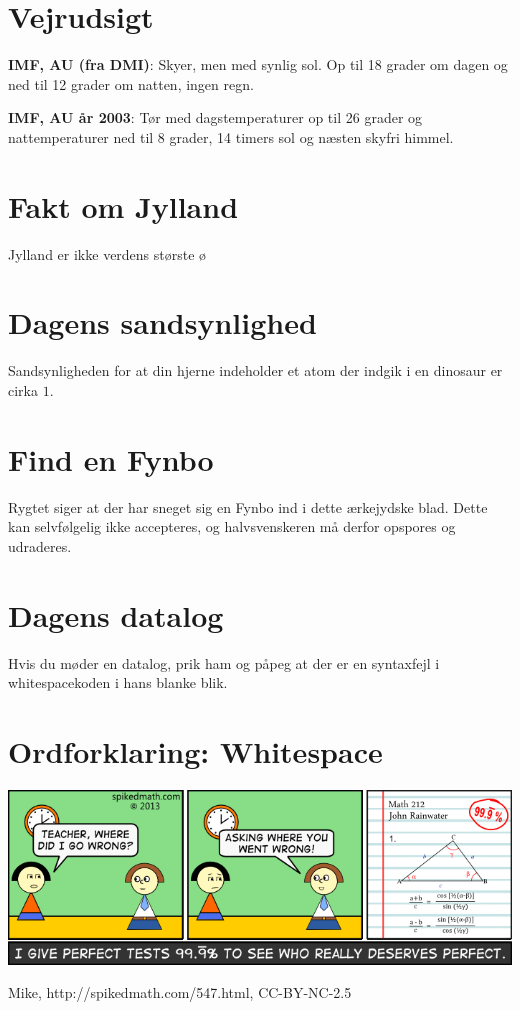 \begin{minipage}[b]{0.95\linewidth}
\begin{minipage}[t]{0.47\textwidth}
\end{minipage}%
\hfill\begin{minipage}[t]{0.47\textwidth}
\vspace{3mm}
\section*{Vejrudsigt}
\textbf{IMF, AU (fra DMI)}: Skyer, men med synlig sol. Op til 18 grader om dagen og ned til 12 grader om natten, ingen regn.

\textbf{IMF, AU år 2003}: Tør med dagstemperaturer op til 26 grader og nattemperaturer ned til 8 grader, 14 timers sol og næsten skyfri himmel.

\section*{Fakt om Jylland}
Jylland er ikke verdens største ø

\section*{Dagens sandsynlighed}
Sandsynligheden for at din hjerne indeholder et atom der indgik i en dinosaur er cirka $1$.

\section*{Find en Fynbo}
Rygtet siger at der har sneget sig en Fynbo ind i dette ærkejydske blad. Dette kan selvfølgelig ikke accepteres, og halvsvenskeren må derfor opspores og udraderes.

\section*{Dagens datalog}
Hvis du møder en datalog, prik ham og påpeg at der er en syntaxfejl i whitespacekoden i hans blanke blik.

\section*{Ordforklaring: Whitespace}
\vspace{4cm}
\end{minipage}

\includegraphics[width=\textwidth]{547-the-perfect-score.png}
\begin{center}
\tiny Mike, http://spikedmath.com/547.html, CC-BY-NC-2.5


\end{center}
\end{minipage}
